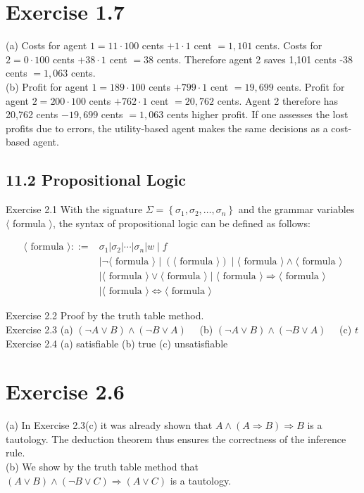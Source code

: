 \documentclass[10pt]{book}
\begin{document}
\begin{center}
\begin{enumerate}
\begin{center}
\begin{center}
\begin{center}
\begin{center}
\begin{center}
\section*{Exercise 1.7}
(a) Costs for agent $1=11 \cdot 100$ cents $+1 \cdot 1$ cent $=1,101$ cents. Costs for $2=0 \cdot 100$ cents $+38 \cdot 1$ cent $=38$ cents. Therefore agent 2 saves 1,101 cents -38 cents $=1,063$ cents.\\
(b) Profit for agent $1=189 \cdot 100$ cents $+799 \cdot 1$ cent $=19,699$ cents. Profit for agent $2=200 \cdot 100$ cents $+762 \cdot 1$ cent $=20,762$ cents. Agent 2 therefore has 20,762 cents $-19,699$ cents $=1,063$ cents higher profit. If one assesses the lost profits due to errors, the utility-based agent makes the same decisions as a cost-based agent.

\subsection*{11.2 Propositional Logic}
Exercise 2.1 With the signature $\Sigma=\left\{\sigma_{1}, \sigma_{2}, \ldots, \sigma_{n}\right\}$ and the grammar variables $\langle$ formula $\rangle$, the syntax of propositional logic can be defined as follows:

$$
\begin{aligned}
\langle\text { formula }\rangle::= & \sigma_{1}\left|\sigma_{2}\right| \cdots\left|\sigma_{n}\right| w \mid f \\
& \mid \neg\langle\text { formula }\rangle \mid(\langle\text { formula }\rangle) \mid\langle\text { formula }\rangle \wedge\langle\text { formula }\rangle \\
& \mid\langle\text { formula }\rangle \vee\langle\text { formula }\rangle \mid\langle\text { formula }\rangle \Rightarrow\langle\text { formula }\rangle \\
& \mid\langle\text { formula }\rangle \Leftrightarrow\langle\text { formula }\rangle
\end{aligned}
$$

Exercise 2.2 Proof by the truth table method.\\
Exercise 2.3 (a) $(\neg A \vee B) \wedge(\neg B \vee A) \quad$ (b) $(\neg A \vee B) \wedge(\neg B \vee A) \quad$ (c) $t$\\
Exercise 2.4 (a) satisfiable (b) true (c) unsatisfiable

\section*{Exercise 2.6}
(a) In Exercise 2.3(c) it was already shown that $A \wedge(A \Rightarrow B) \Rightarrow B$ is a tautology. The deduction theorem thus ensures the correctness of the inference rule.\\
(b) We show by the truth table method that $(A \vee B) \wedge(\neg B \vee C) \Rightarrow(A \vee C)$ is a tautology.


\end{center}
\end{center}
\end{center}
\end{center}
\end{center}
\end{enumerate}
\end{center}
\end{document}
